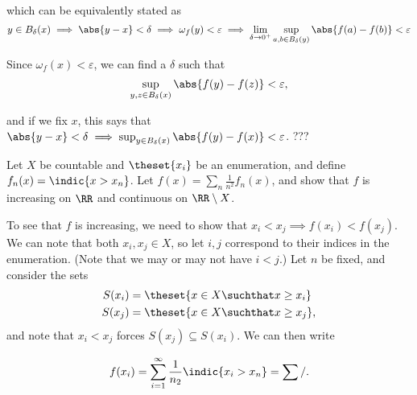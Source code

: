 \begin{solution}
\begin{enumerate}
  which can be equivalently stated as
  $$
  y\in B_\delta(x) \implies \abs{y - x} < \delta \implies
  \omega_f(y) < \varepsilon \implies
  \lim_{\delta\to 0^+} \sup_{a,b \in B_\delta(y)}\abs{f(a) - f(b)} < \varepsilon
  $$

  Since $\omega_f(x) < \varepsilon$, we can find a $\delta$ such that
  $$
  \sup_{y,z \in B_{\delta}(x)} \abs{f(y) - f(z)} < \varepsilon,
  $$

  and if we fix $x$, this says that $\abs{y - x} < \delta \implies \sup_{y \in B_\delta(x)} \abs{f(y) - f(x)} < \varepsilon$. ???
\end{enumerate}
\end{solution}

\begin{problem}
  Let $X$ be countable and $\theset{x_i}$ be an enumeration, and define $f_n(x) = \indic{x > x_n}$. Let $f(x) = \sum_n \frac 1 {n^2} f_n(x)$, and show that $f$ is increasing on $\RR$ and continuous on $\RR\setminus X$.
\end{problem}

\begin{solution}\hfill
  To see that $f$ is increasing, we need to show that $x_i < x_j \implies f(x_i) < f(x_j)$.
  We can note that both $x_i, x_j \in X$, so let $i,j$ correspond to their indices in the enumeration.
  (Note that we may or may not have $i < j$.) Let $n$ be fixed, and consider the sets
\[
  \begin{align*}
    S(x_i) &= \theset{x\in X \suchthat x \geq x_i} \\
    S(x_j) &= \theset{x\in X \suchthat x \geq x_j}
  ,\end{align*}
\]
and note that $x_i < x_j$ forces $S(x_j) \subseteq S(x_i)$. We can then write

\[
  \begin{align*}
    f(x_i) = \sum_{i=1}^\infty \frac 1 {n_2} \indic{x_i > x_n} = \sum_{}/
  .\end{align*}
\]

\end{solution}

